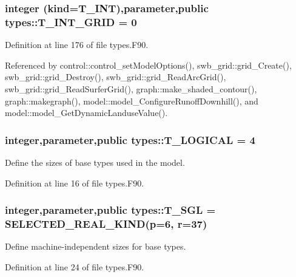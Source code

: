 \hypertarget{namespacetypes_acc2ffd0be776cd4fca9ebcfe4669e82c}{
\subsubsection[{T\_\-INT\_\-GRID}]{\setlength{\rightskip}{0pt plus 5cm}integer (kind={\bf T\_\-INT}),parameter,public {\bf types::T\_\-INT\_\-GRID} = 0}}
\label{namespacetypes_acc2ffd0be776cd4fca9ebcfe4669e82c}


Definition at line 176 of file types.F90.



Referenced by control::control\_\-setModelOptions(), swb\_\-grid::grid\_\-Create(), swb\_\-grid::grid\_\-Destroy(), swb\_\-grid::grid\_\-ReadArcGrid(), swb\_\-grid::grid\_\-ReadSurferGrid(), graph::make\_\-shaded\_\-contour(), graph::makegraph(), model::model\_\-ConfigureRunoffDownhill(), and model::model\_\-GetDynamicLanduseValue().

\hypertarget{namespacetypes_adfa8f4f6096bb7bdbb93f36b911dcaad}{
\subsubsection[{T\_\-LOGICAL}]{\setlength{\rightskip}{0pt plus 5cm}integer,parameter,public {\bf types::T\_\-LOGICAL} = 4}}
\label{namespacetypes_adfa8f4f6096bb7bdbb93f36b911dcaad}


Define the sizes of base types used in the model. 



Definition at line 16 of file types.F90.

\hypertarget{namespacetypes_af3012489af4c138f271f1bce244b7e51}{
\subsubsection[{T\_\-SGL}]{\setlength{\rightskip}{0pt plus 5cm}integer,parameter,public {\bf types::T\_\-SGL} = SELECTED\_\-REAL\_\-KIND(p=6, r=37)}}
\label{namespacetypes_af3012489af4c138f271f1bce244b7e51}


Define machine-\/independent sizes for base types. 



Definition at line 24 of file types.F90.

